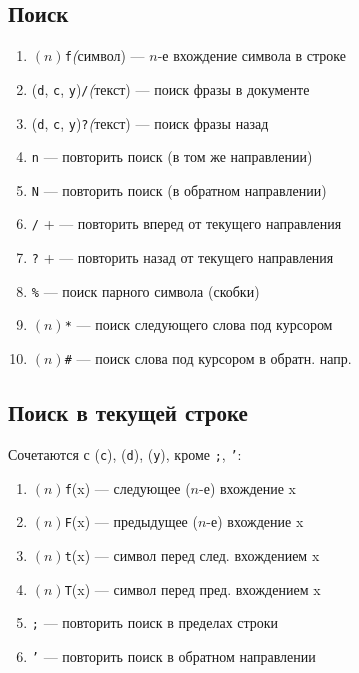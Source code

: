 \documentclass[a4paper,10pt, twocolumn]{article}
\newcommand*{\cod}[1]{\texttt{#1}}
\begin{document}
\subsection{Поиск}
\begin{enumerate}
    \item $(n)$\cod{f}\textit(символ) --- $n$-е вхождение символа в строке
    \item(\cod{d}, \cod{c}, \cod{y})\cod{/}\textit(текст) --- поиск фразы в документе
    \item(\cod{d}, \cod{c}, \cod{y})\cod{?}\textit(текст) --- поиск фразы назад
    \item \cod{n} --- повторить поиск (в том же направлении)
    \item \cod{N} --- повторить поиск (в обратном направлении)
    \item \cod{/} + \Enter --- повторить вперед от текущего направления
    \item \cod{?} + \Enter --- повторить назад от текущего направления
    \item \cod{\%} --- поиск парного символа (скобки)
    \item $(n)$\cod{*} --- поиск следующего слова под курсором
    \item $(n)$\cod{\#} --- поиск слова под курсором в обратн. напр.
\end{enumerate}

\subsection{Поиск в текущей строке}
Сочетаются с (\cod{c}), (\cod{d}), (\cod{y}), кроме \cod{;}, \cod{'}:
\begin{enumerate}
    \item $(n)$\cod{f}(x) --- следующее ($n$-е) вхождение x
    \item $(n)$\cod{F}(x) --- предыдущее ($n$-е) вхождение x
    \item $(n)$\cod{t}(x) --- символ перед след. вхождением x
    \item $(n)$\cod{T}(x) --- символ перед пред. вхождением x
    \item \cod{;} --- повторить поиск в пределах строки
    \item \cod{'} --- повторить поиск в обратном направлении
\end{enumerate}
\end{document}
